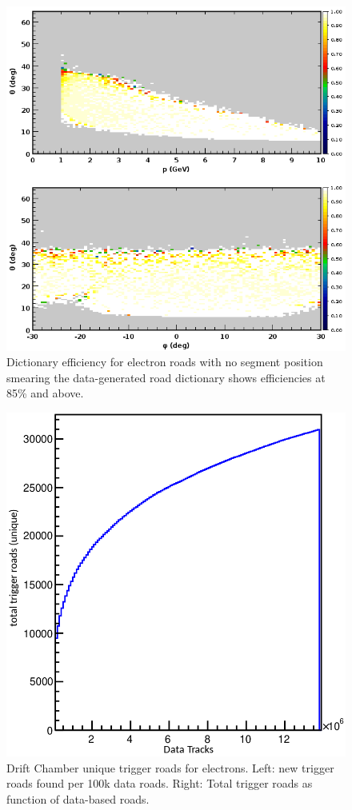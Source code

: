 \begin{figure}[hbt]
	\centering
	\includegraphics[width=1.0\columnwidth,keepaspectratio]{img/dc_neg_data_efficiency_nosmearing.png}
	\caption{Dictionary efficiency for electron roads with no segment position smearing the data-generated
          road dictionary shows efficiencies at 85\% and above.}
	\label{fig:dc_neg_data_efficiency_nosmearing}
\end{figure}

\begin{figure}[hbt]
	\centering
	\includegraphics[width=0.85\columnwidth,keepaspectratio]{img/dc_neg_data_dictionary.png}
	\caption{Drift Chamber unique trigger roads for electrons. Left: new trigger roads found per 100k data
          roads. Right: Total trigger roads as function of data-based roads.}
	\label{fig:dc_neg_data_dictionary}
\end{figure}

